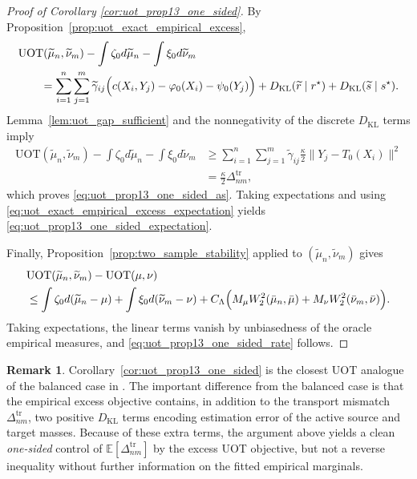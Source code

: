 \documentclass[11pt,reqno]{amsart}
\theoremstyle{definition}
\newtheorem{remark}{Remark}
\newcommand{\KL}{\mathrm{KL}}
\renewcommand{\tilde}{\widetilde}
\newcommand{\Ep}{\mathbb{E}}
\begin{document}
\begin{proof}[Proof of Corollary \ref{cor:uot_prop13_one_sided}]
By Proposition~\ref{prop:uot_exact_empirical_excess},
\begin{align}
\begin{aligned}
&\mathrm{UOT}(\tilde\mu_n,\tilde\nu_m)
- \int \zeta_0  d\tilde\mu_n
- \int \xi_0  d\tilde\nu_m \\
&\qquad=
\sum_{i=1}^n\sum_{j=1}^m
\tilde\gamma_{ij}
\Bigl(
c(X_i,Y_j)-\varphi_0(X_i)-\psi_0(Y_j)
\Bigr)
+ {D_\KL}(\tilde r \mid r^\star)
+ {D_\KL}(\tilde s \mid s^\star).
\end{aligned}
\end{align}
Lemma~\ref{lem:uot_gap_sufficient} and the nonnegativity of the {discrete $D_\KL$ terms} imply
\begin{align}
    \mathrm{UOT}(\tilde\mu_n,\tilde\nu_m)
    - \int \zeta_0  d\tilde\mu_n
    - \int \xi_0  d\tilde\nu_m
    &\ge
    \sum_{i=1}^n\sum_{j=1}^m
    \tilde\gamma_{ij}\frac{\kappa}{2}\|Y_j-T_0(X_i)\|^2 \\
    &= \frac{\kappa}{2}\Delta_{nm}^{\mathrm{tr}},
\end{align}
which proves \eqref{eq:uot_prop13_one_sided_as}. Taking expectations and using \eqref{eq:uot_exact_empirical_excess_expectation} yields \eqref{eq:uot_prop13_one_sided_expectation}.

Finally, Proposition~\ref{prop:two_sample_stability} applied to $(\tilde\mu_n,\tilde\nu_m)$ gives
\begin{align}
    &\mathrm{UOT}(\tilde\mu_n,\tilde\nu_m)-\mathrm{UOT}(\mu,\nu)\\
    &\le
    \int \zeta_0   d(\tilde\mu_n-\mu)
    + \int \xi_0   d(\tilde\nu_m-\nu)
    + C_\Lambda\Bigl(
        M_\mu W_2^2(\bar\mu_n,\bar\mu)+M_\nu W_2^2(\bar\nu_m,\bar\nu)
    \Bigr).
\end{align}
Taking expectations, the linear terms vanish by unbiasedness of the oracle empirical measures, and \eqref{eq:uot_prop13_one_sided_rate} follows.
\end{proof}

\begin{remark}
Corollary~\ref{cor:uot_prop13_one_sided} is the closest UOT analogue of the balanced case in \cite[Proposition~13]{manole2024plugin}.
The important difference from the balanced case is that the empirical excess objective contains, in addition to the transport mismatch $\Delta_{nm}^{\mathrm{tr}}$, {two positive $D_\KL$ terms encoding estimation error of the active source and target masses.}
Because of these extra terms, the argument above yields a clean \emph{one-sided} control of $\Ep[\Delta_{nm}^{\mathrm{tr}}]$ by the excess UOT objective, but not a reverse inequality without further information on the fitted empirical marginals.
\end{remark}
\end{document}
